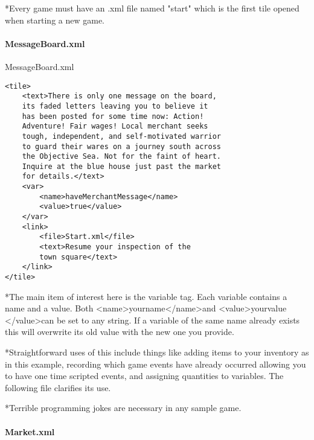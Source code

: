 \documentclass[11pt]{article}
\begin{document}
*Every game must have an .xml file named "start" which is the first tile opened when starting a new game.

\paragraph{MessageBoard.xml}

MessageBoard.xml
\begin{lstlisting}[frame=single]
<tile>
	<text>There is only one message on the board, 
	its faded letters leaving you to believe it 
	has been posted for some time now: Action! 
	Adventure! Fair wages! Local merchant seeks 
	tough, independent, and self-motivated warrior 
	to guard their wares on a journey south across 
	the Objective Sea. Not for the faint of heart. 
	Inquire at the blue house just past the market 
	for details.</text>
	<var>
		<name>haveMerchantMessage</name>
		<value>true</value>
	</var> 
	<link>
		<file>Start.xml</file>
		<text>Resume your inspection of the 
		town square</text>
	</link>
</tile>
\end{lstlisting}

*The main item of interest here is the variable tag. Each variable contains a name and a value. Both \textless name\textgreater yourname\textless /name\textgreater  and \textless value\textgreater yourvalue \textless /value\textgreater  can be set to any string. If a variable of the same name already exists this will overwrite its old value with the new one you provide.

*Straightforward uses of this include things like adding items to your inventory as in this example, recording which game events have already occurred allowing you to have one time scripted events, and assigning quantities to variables. The following file clarifies its use.

*Terrible programming jokes are necessary in any sample game.


\paragraph{Market.xml}
\end{document}
